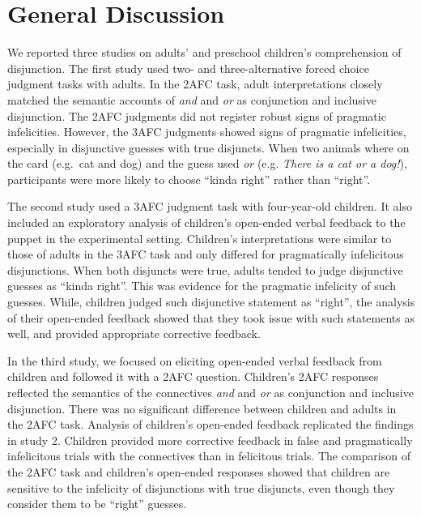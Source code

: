 \documentclass[,man,floatsintext]{apa6}
\begin{document}
\hypertarget{general-discussion}{%
\section{General Discussion}\label{general-discussion}}

We reported three studies on adults' and preschool children's comprehension of disjunction. The first study used two- and three-alternative forced choice judgment tasks with adults. In the 2AFC task, adult interpretations closely matched the semantic accounts of \emph{and} and \emph{or} as conjunction and inclusive disjunction. The 2AFC judgments did not register robust signs of pragmatic infelicities. However, the 3AFC judgments showed signs of pragmatic infelicities, especially in disjunctive guesses with true disjuncts. When two animals where on the card (e.g.~cat and dog) and the guess used \emph{or} (e.g. \emph{There is a cat or a dog!}), participants were more likely to choose \enquote{kinda right} rather than \enquote{right}.

The second study used a 3AFC judgment task with four-year-old children. It also included an exploratory analysis of children's open-ended verbal feedback to the puppet in the experimental setting. Children's interpretations were similar to those of adults in the 3AFC task and only differed for pragmatically infelicitous disjunctions. When both disjuncts were true, adults tended to judge disjunctive guesses as \enquote{kinda right}. This was evidence for the pragmatic infelicity of such guesses. While, children judged such disjunctive statement as \enquote{right}, the analysis of their open-ended feedback showed that they took issue with such statements as well, and provided appropriate corrective feedback.

In the third study, we focused on eliciting open-ended verbal feedback from children and followed it with a 2AFC question. Children's 2AFC responses reflected the semantics of the connectives \emph{and} and \emph{or} as conjunction and inclusive disjunction. There was no significant difference between children and adults in the 2AFC task. Analysis of children's open-ended feedback replicated the findings in study 2. Children provided more corrective feedback in false and pragmatically infelicitous trials with the connectives than in felicitous trials. The comparison of the 2AFC task and children's open-ended responses showed that children are sensitive to the infelicity of disjunctions with true disjuncts, even though they consider them to be \enquote{right} guesses.
\end{document}
